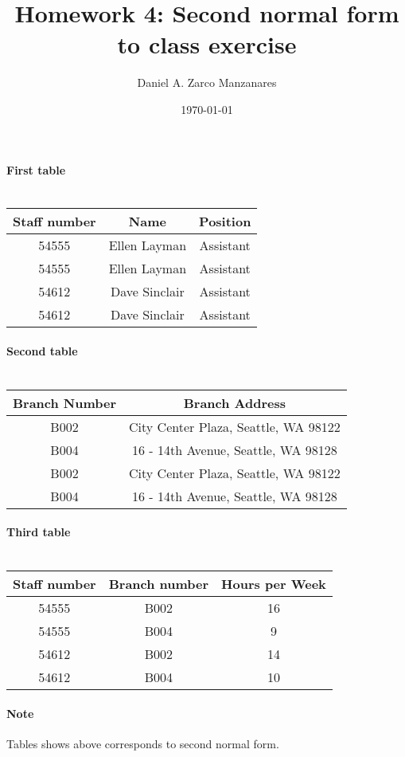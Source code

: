 \documentclass{article}
\begin{document}
\title{Homework 4: Second normal form to class exercise}
\author{Daniel A. Zarco Manzanares}
\date{\today}
\maketitle
\paragraph{First table\\\\}
\begin{tabular}{|c|c|c|}
Staff number & Name & Position\\
\hline
54555 & Ellen Layman & Assistant\\
54555 & Ellen Layman & Assistant\\
54612 & Dave Sinclair & Assistant\\
54612 & Dave Sinclair & Assistant\\
\end{tabular}
\paragraph{Second table\\\\}
\begin{tabular}{|c|c|}
Branch Number & Branch Address\\
\hline
B002 & City Center Plaza, Seattle, WA 98122\\
B004 & 16 - 14th Avenue, Seattle, WA 98128\\
B002 & City Center Plaza, Seattle, WA 98122\\
B004 & 16 - 14th Avenue, Seattle, WA 98128\\
\end{tabular}
\paragraph{Third table\\\\}
\begin{tabular}{|c|c|c|}
Staff number & Branch number & Hours per Week\\
\hline
54555 & B002 & 16\\
54555 & B004 & 9\\
54612 & B002 & 14\\
54612 & B004 & 10\\
\end{tabular}
\paragraph{Note\\}
Tables shows above corresponds to second normal form.
\end{document}
